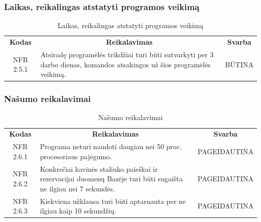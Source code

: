 \documentclass{VUMIFPSkursinis}
\begin{document}
\subsubsection{Laikas, reikalingas atstatyti programos veikimą}
\begin{center}
	\begin{table}[H]
	\caption{Laikas, reikalingas atstatyti programos veikimą}
	\begin{tabular}{|p{2cm}|p{}|p{}|}
	\hline
	    \rowcolor{lightgray}
		\multicolumn{3}{|c|}{Laikas, reikalingas atstatyti programos veikimą}\\
		
	\hline
		\multicolumn{1}{|c|}{{\bfseries Kodas}}&
		\multicolumn{1}{|c|}{{\bfseries Reikalavimas}}&
		\multicolumn{1}{|c|}{{\bfseries Svarba}}\\
	\hline 	
		\multicolumn{1}{|c|}{NFR 2.5.1}&
		{Atsiradę programėlės trikdžiai turi būti sutvarkyti per 3 darbo dienas, komandos atsakingos už šios programėlės veikimą.}&
		\multicolumn{1}{|c|}{BŪTINA}\\		
	\hline
	
	
	\end{tabular}
	
	\label{table:Laikasreikalingasatstatytiprogramosveikimą}
	\end{table}

\end{center}


\subsubsection{Našumo reikalavimai}
\begin{center}
	\begin{table}[H]
	\caption{Našumo reikalavimai}
	\begin{tabular}{|p{2cm}|p{}|p{}|}
	\hline
	    \rowcolor{lightgray}
		\multicolumn{3}{|c|}{Našumo reikalavimai}\\
		
	\hline
		\multicolumn{1}{|c|}{{\bfseries Kodas}}&
		\multicolumn{1}{|c|}{{\bfseries Reikalavimas}}&
		\multicolumn{1}{|c|}{{\bfseries Svarba}}\\
	\hline 	
		\multicolumn{1}{|c|}{NFR 2.6.1}&
		{Programa neturi naudoti daugiau nei 50 proc. procesoriaus pajėgumo.}&
		\multicolumn{1}{|p{1.5cm}|}{PAGEIDAUTINA}\\	
	\hline 	
		\multicolumn{1}{|c|}{NFR 2.6.2}&
		{Konkrečiai kavinės staliuko paieškai ir rezervacijai duomenų Bazėje turi būti sugaišta ne ilgiau nei 7 sekundės.}&
		\multicolumn{1}{|p{1.5cm}|}{PAGEIDAUTINA}\\	
	\hline 	
		\multicolumn{1}{|c|}{NFR 2.6.3}&
		{Kiekviena užklausa turi būti aptarnauta per ne ilgiau kaip 10 sekundžių.}&
		\multicolumn{1}{|p{1.5cm}|}{PAGEIDAUTINA}\\		
	\hline
	
	
	\end{tabular}
	
	\label{table:Našumoreikalavimai}
	\end{table}

\end{center}
\end{document}
